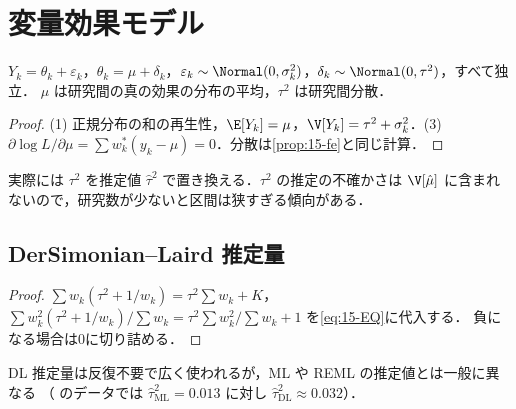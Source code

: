 \section{変量効果モデル}\label{sec:15-random}
\Hinshutsu
\begin{teigi}[変量効果モデル]\label{def:15-re}
$Y_k=\theta_k+\varepsilon_k$，$\theta_k=\mu+\delta_k$，$\varepsilon_k\sim\Normal(0,\sigma_k^2)$，$\delta_k\sim\Normal(0,\tau^2)$，すべて独立．
$\mu$ は研究間の真の効果の分布の平均，$\tau^2$ は研究間分散．
\end{teigi}
\begin{proof}
(1) 正規分布の和の再生性，$\E[Y_k]=\mu$，$\V[Y_k]=\tau^2+\sigma_k^2$．(3) $\partial\log L/\partial\mu=\sum w_k^*(y_k-\mu)=0$．分散は\cref{prop:15-fe}と同じ計算．
\end{proof}
実際には $\tau^2$ を推定値 $\hat\tau^2$ で置き換える．$\tau^2$ の推定の不確かさは $\V[\hat\mu]$ に含まれないので，研究数が少ないと区間は狭すぎる傾向がある．

\subsection{DerSimonian--Laird 推定量}\label{subsec:15-dl}
\begin{proof}
$\sum w_k(\tau^2+1/w_k)=\tau^2\sum w_k+K$，$\sum w_k^2(\tau^2+1/w_k)/\sum w_k=\tau^2\sum w_k^2/\sum w_k+1$ を\cref{eq:15-EQ}に代入する．
負になる場合は0に切り詰める．
\end{proof}
DL 推定量は反復不要で広く使われるが，ML や REML の推定値とは一般に異なる
（ のデータでは $\hat\tau^2_{\mathrm{ML}}=0.013$ に対し $\hat\tau^2_{\mathrm{DL}}\approx0.032$）．

